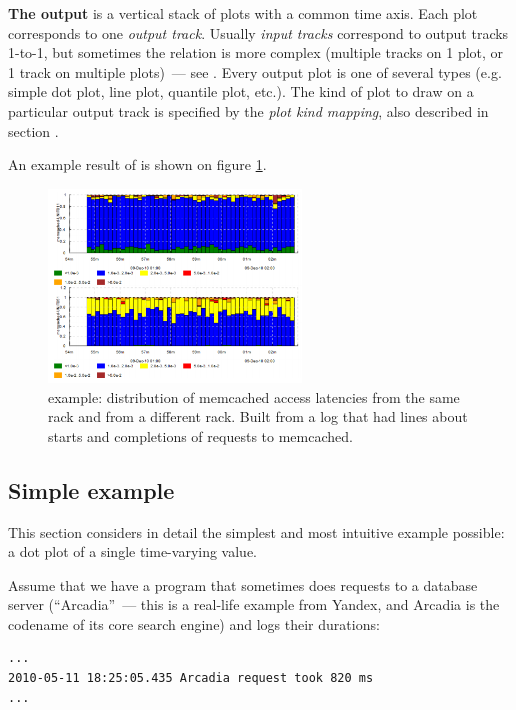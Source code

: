 \documentclass{article}
\begin{document}
\textbf{The output} is a vertical stack of plots with a common time axis. Each plot corresponds to one \emph{output track}. Usually \emph{input tracks} correspond to output tracks 1-to-1, but sometimes the relation is more complex (multiple tracks on 1 plot, or 1 track on multiple plots)~--- see . Every output plot is one of several types (e.g. simple dot plot, line plot, quantile plot, etc.). The kind of plot to draw on a particular output track is specified by the \emph{plot kind mapping}, also described in section .

An example result of \timeplot{} is shown on figure \ref{fig:tplot-example}.

\begin{figure}[h]
\center
\includegraphics[width=0.6\textwidth]{pics/tplot/tplot-motivating-example.png}
\caption{\timeplot{} example: distribution of memcached access latencies from the same rack and from a different rack. Built from a log that had lines about starts and completions of requests to memcached.}
\label{fig:tplot-example}
\end{figure}

\pagebreak
\subsection{Simple example}
\label{sec:tplot-simple-example}
This section considers in detail the simplest and most intuitive example possible: a dot plot of a single time-varying value.

Assume that we have a program that sometimes does requests to a database server (``Arcadia''~--- this is a real-life example from Yandex, and Arcadia is the codename of its core search engine) and logs their durations:

\begin{verbatim}
...
2010-05-11 18:25:05.435 Arcadia request took 820 ms
...
\end{verbatim}
\end{document}
